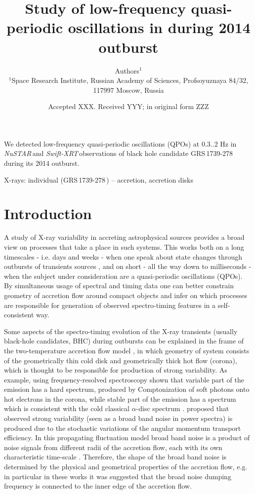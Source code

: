 \documentclass[a4paper,fleqn,usenatbib]{mnras}
\title[Study of low-frequency QPO in \grs]{Study of low-frequency quasi-periodic oscillations in \grs during 2014 outburst}
\author[Authors]{
Authors$^{1}$
\\
$^{1}$Space Research Institute, Russian Academy of Sciences, Profsoyuznaya 84/32, 117997 Moscow, Russia\\
}
\date{Accepted XXX. Received YYY; in original form ZZZ}
\def\grs{{GRS\,1739-278\,}}
\def\swiftx{{\em Swift-XRT\,}}
\def\nustar{{\em NuSTAR\,}}
\begin{document}
\label{firstpage}
\pagerange{\pageref{firstpage}--\pageref{lastpage}}
\maketitle

\begin{abstract}
\end{abstract}
We detected low-frequency quasi-periodic oscillations (QPOs) at 0.3..2 Hz in \nustar and \swiftx observations of black hole candidate \grs during its 2014 outburst.

\begin{keywords}
X-rays: individual (\grs)  -- accretion, accretion disks	
\end{keywords}


\section{Introduction}
\label{sec:intro} 
A study of X-ray variability in accreting astrophysical sources provides a broad view on processes that take a place in such systems. This works both on a long timescales - i.e. days and weeks - when one speak about state changes through outbursts of transients sources  \citep[see e.g.][]{2005Ap&SS.300..107H, heil15}, and on short - all the way down to milliseconds - when the subject under consideration are a quasi-periodic oscillations (QPOs). By simultaneous usage of spectral and timing data one can better constrain geometry of accretion flow around compact objects and infer on which processes are responsible for generation of observed spectro-timing features in a self-consistent way.

Some aspects of the spectro-timing evolution of the X-ray transients (usually black-hole candidates, BHC) during outbursts can be explained in the frame of the two-temperature accretion flow model \citep{1975ApJ...199L.153E, 1976ApJ...204..187S, 1995ApJ...452..710N}, in which geometry of system consists of the geometrically thin cold disk and geometrically thick hot flow (corona), which is thought to be responsible for production of strong variability. As example, using frequency-resolved spectroscopy \citet{2001MNRAS.321..759C} shown that variable part of the emission has a hard spectrum, produced by Comptonization of soft photons onto hot electrons in the corona, while stable part of the emission has a spectrum which is consistent with the cold classical $\alpha$-disc spectrum \citep{shakura73}.  \cite{1997MNRAS.292..679L} proposed that observed strong variability (seen as a broad band noise in power spectra) is produced due to the stochastic variations of the angular momentum transport efficiency. In this propagating fluctuation model broad band noise is a product of noise signals from different radii of the accretion flow, each with its own characteristic time-scale \citep[see, e.g.][]{2006MNRAS.367..801A, 2013MNRAS.434.1476I}. Therefore, the shape of the broad band noise is determined by the physical and geometrical properties of the accretion flow, e.g. in particular in these works it was suggested that the broad noise dumping frequency is connected to the inner edge of the accretion flow. 
\end{document}
